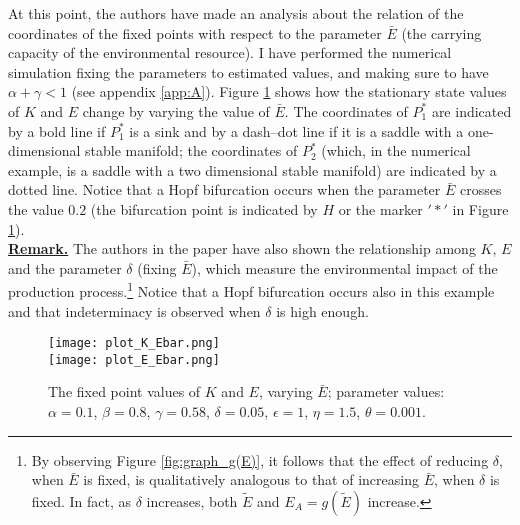 At this point, the authors have made an analysis about the relation of the coordinates of the fixed points with respect to the parameter $\bar{E}$ (the carrying capacity of the environmental resource). I have performed the numerical simulation fixing the parameters to estimated values, and making sure to have $\alpha+\gamma<1$ (see appendix \ref{app:A}). Figure \ref{fig:plot_K_E_Ebar} shows how the stationary state values of $K$ and $E$ change by varying the value of $\bar{E}$. The coordinates of $P_1^*$ are indicated by a bold line if $P_1^*$ is a sink and by a dash–dot line if it is a saddle with a one-dimensional stable manifold; the coordinates of $P_2^*$ (which, in the numerical example, is a saddle with a two dimensional stable manifold) are indicated by a dotted line. Notice that a Hopf bifurcation occurs when the parameter $\bar{E}$ crosses the value $0.2$ (the bifurcation point is indicated by $H$ or the marker $'*'$ in Figure \ref{fig:plot_K_E_Ebar}).\\
\underline{\bf Remark.} The authors in the paper have also shown the relationship among $K$, $E$ and the parameter $\delta$ (fixing $\bar{E}$), which measure the environmental impact of the production process.\footnote{By observing Figure \ref{fig:graph_g(E)}, it follows that the effect of reducing $\delta$, when $\bar{E}$ is fixed, is qualitatively analogous to that of increasing $\bar{E}$, when $\delta$ is fixed. In fact, as $\delta$ increases, both $\tilde{E}$ and $E_A = g(\tilde{E})$ increase.}
Notice that a Hopf bifurcation occurs also in this example and that indeterminacy is observed when $\delta$ is high enough.
\begin{figure}[h!]
	\centering
	\texttt{[image: plot\_K\_Ebar.png]}\\
	\vspace{.3cm}
	\texttt{[image: plot\_E\_Ebar.png]}
	\caption{The fixed point values of $K$ and $E$, varying $\bar{E}$; parameter values: $\alpha=0.1$, $\beta=0.8$, $\gamma=0.58$, $\delta=0.05$, $\epsilon=1$, $\eta=1.5$, $\theta=0.001$.}
	\label{fig:plot_K_E_Ebar}
\end{figure}

